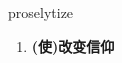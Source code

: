 
\begin{frame}
{\huge proselytize}
\begin{center}
\begin{enumerate}\Large
  \item \textbf{(使)改变信仰}
\end{enumerate}
\end{center}
\end{frame}
